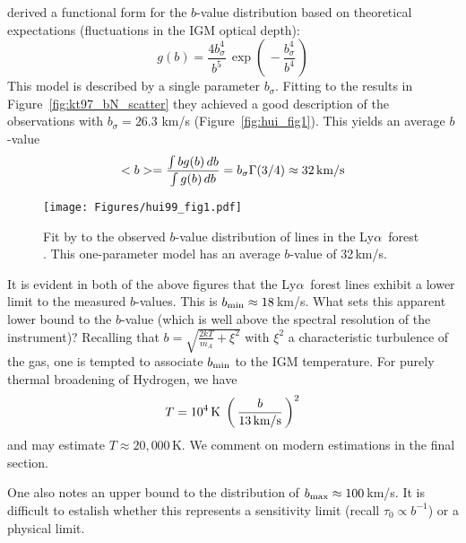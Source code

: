 \documentclass[graybox]{svmult}
\def\lya{Ly$\alpha$}
\def\ltp{\left ( \,}
\def\rtp{\, \right  ) }
\begin{document}
\cite{hr99} derived a functional form for the $b$-value
distribution based on theoretical expectations (fluctuations
in the IGM optical depth):
\begin{equation}
g(b) = \frac{4 b_\sigma^4}{b^5} \, \exp \ltp - \frac{b_\sigma^4}{b^4} \rtp
\end{equation}
This model is described by a single parameter $b_\sigma$.
Fitting to the results in Figure~\ref{fig:kt97_bN_scatter}
they achieved a 
good description of the observations with $b_\sigma = 26.3$ km/s
(Figure~\ref{fig:hui_fig1}).
This yields an average $b$-value
\begin{equation}
<b> = \frac{\int b g(b) \, db}{\int g(b) \, db} = b_\sigma \Gamma(3/4)
\approx 32 \, {\rm km/s}
\end{equation}

%
\begin{figure}[b]
\sidecaption
\texttt{[image: Figures/hui99\_fig1.pdf]}
%
%
\caption{Fit by \cite{hr99} to the observed $b$-value distribution of
lines in the \lya\ forest \cite{kt97}.  This one-parameter
model has an average $b$-value of 32\,km/s.
}
\label{fig:hui99_fig1}       %
\end{figure}

It is evident in both of the above figures that the
\lya\ forest lines exhibit a lower limit to the 
measured $b$-values.  This is  $b_{\rm min} \approx 18$\,km/s.
What sets this apparent lower bound to the $b$-value (which is 
well above the spectral resolution of the instrument)?
Recalling that $b = \sqrt{\frac{2kT}{m_A} + \xi^2}$
with $\xi^2$ a characteristic turbulence of the gas,
one is tempted to associate $b_{\rm min}$ to the IGM temperature.
For purely thermal broadening of Hydrogen, we have
\begin{equation}
T = 10^4 \, {\rm K} \; \ltp \frac{b}{13 \, \rm km/s} \rtp^2
\end{equation}
and may estimate $T \approx 20,000$\,K.
We comment on modern estimations in the final section.

One also notes an upper bound to the distribution
of $b_{\rm max} \approx 100$\,km/s.
It is difficult to estalish whether this represents
a sensitivity limit (recall $\tau_0 \propto b^{-1}$)
or a physical limit.
\end{document}
